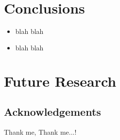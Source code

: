 \documentclass[a0,portrait]{a0poster}
\newcommand*\hlitem[1][EMBLRed]{\color{#1}\item\color{Black}}
\begin{document}
\begin{multicols}{2}
\section*{Conclusions}

\begin{itemize}
\hlitem blah blah
\hlitem blah blah
\end{itemize}


\section*{Future Research}

\small
\begin{multicols}{2}


\section*{Acknowledgements}

Thank me, Thank me...!
\end{multicols}

\end{multicols}
\vfill
\end{document}

